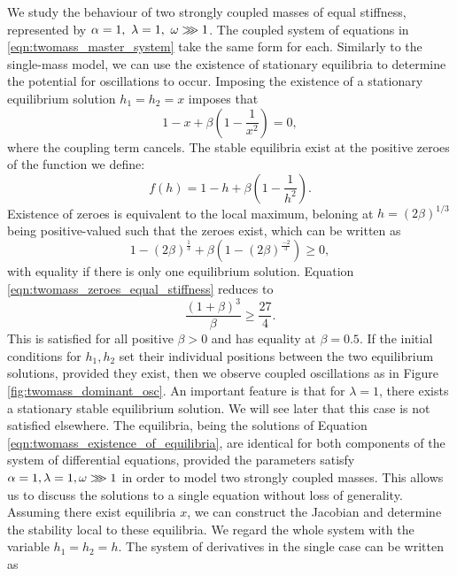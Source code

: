 \documentclass{article}
\begin{document}
We study the behaviour of two strongly coupled masses of equal stiffness, represented by \( \alpha = 1,~\lambda = 1,~\omega \gggtr 1\).
The coupled system of equations in \ref{eqn:twomass_master_system} take the same form for each.
Similarly to the single-mass model, we can use the existence of stationary equilibria to determine the potential for oscillations to occur.
Imposing the existence of a stationary equilibrium solution \(h_1 = h_2 = x\) imposes that
\begin{equation}
    1 - x + \beta\left(
        1 - \frac{1}{x^2}
    \right) = 0,
\end{equation}
where the coupling term cancels.
The stable equilibria exist at the positive zeroes of the function we define:
\begin{equation}
    f(h) = 1 - h + \beta \left( 1 - \frac{1}{h^2} \right).
    \label{eqn:twomass_existence_of_equilibria}
\end{equation}
Existence of zeroes is equivalent to the local maximum, beloning at \(h = \left( 2\beta \right)^{1/3}\) being positive-valued such that the zeroes exist,
which can be written as
\begin{equation}
    1 - \left(2\beta\right)^\frac{1}{3} + \beta\left( 1 - (2\beta)^\frac{-2}{3} \right) \ge 0,
    \label{eqn:twomass_zeroes_equal_stiffness}
\end{equation}
with equality if there is only one equilibrium solution.
Equation \ref{eqn:twomass_zeroes_equal_stiffness} reduces to
\begin{equation}
    \frac{(1+\beta)^3}{\beta} \ge \frac{27}{4}.
\end{equation}
This is satisfied for all positive $\beta>0$ and has equality at $\beta = 0.5$.
If the initial conditions for \(h_1, h_2\) set their individual positions between the two equilibrium solutions,
provided they exist,
then we observe coupled oscillations as in Figure \ref{fig:twomass_dominant_osc}.
An important feature is that for \(\lambda = 1\), there exists a stationary stable equilibrium solution.
We will see later that this case is not satisfied elsewhere. %
The equilibria, being the solutions of Equation \ref{eqn:twomass_existence_of_equilibria}, are identical for both components of the system of differential equations,
provided the parameters satisfy \(\alpha = 1, \lambda = 1, \omega \gggtr 1\) in order to model two strongly coupled masses.
This allows us to discuss the solutions to a single equation without loss of generality.
Assuming there exist equilibria \(x\), 
we can construct the Jacobian and determine the stability local to these equilibria.
We regard the whole system with the variable \(h_1=h_2=h\).
The system of derivatives in the single case can be written as
\end{document}
